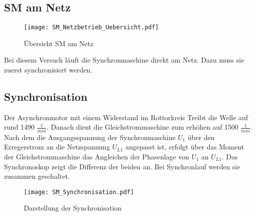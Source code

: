 \begin{flushleft}


\newpage
{}  %
\section{SM am Netz}

\vspace{0.3cm}
\begin{figure}[H]
    \centering
        \texttt{[image: SM\_Netzbetrieb\_Uebersicht.pdf]}
    \caption{Übersicht SM am Netz}
    \label{fig:abb1}
\end{figure}\vspace{0.3cm}
 Bei diesem Versuch läuft die Synchronmaschine direkt am Netz. Dazu muss sie zuerst synchronisiert werden. 

\subsection{Synchronisation}
Der Asynchronmotor mit einem Widerstand im Rottorkreis Treibt die Welle auf rund 1490 $\frac{1}{min}$. Danach dient die Gleichstrommaschine zum erhöhen auf 1500 $\frac{1}{min}$. Nach dem die Ausgangsspannung der Synchronmaschine $U_1$ über den Erregerstrom an die Netzspannung $U_{L1}$ angepasst ist, erfolgt über das Moment der Gleichstrommaschine das Angleichen der Phasenlage von $U_1$ an $U_{L1}$. Das Synchronoskop zeigt die Differenz der beiden an. Bei Synchronlauf werden sie zusammen geschaltet. 
\vspace{0.3cm}
\begin{figure}[H]
    \centering
        \texttt{[image: SM\_Synchronisation.pdf]}
    \caption{Darstellung der Synchronisation}
    \label{fig:abb1}
\end{figure}\vspace{0.3cm}

\end{flushleft}
